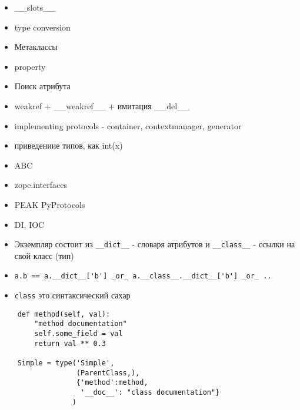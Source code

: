 \documentclass{article}
\begin{document}
\LARGE

\begin{itemize}
    \item \_\_slots\_\_
    \item type conversion
    \item Метаклассы
    \item property
    \item Поиск атрибута
    \item weakref + \_\_weakref\_\_ + имитация \_\_del\_\_
    \item implementing protocols - container, contextmanager, generator
    \item приведениие типов, как int(x)
    \item ABC
    \item zope.interfaces
    \item PEAK PyProtocols
    \item DI, IOC
\end{itemize}
\newpage

\begin{itemize}
\item Экземпляр состоит из \lstinline!__dict__! - словаря атрибутов и 
        \lstinline!__class__! - ссылки на свой класс (тип)
\item \lstinline!a.b == a.__dict__['b'] _or_ a.__class__.__dict__['b'] _or_ ..!
\end{itemize}
\newpage

\begin{itemize}
\item \lstinline!class! это синтаксический сахар
\end{itemize}
{
\LARGE \vspace{15pt}
\begin{lstlisting}
    def method(self, val):
        "method documentation"
        self.some_field = val
        return val ** 0.3

    Simple = type('Simple', 
                  (ParentClass,), 
                  {'method':method, 
                   '__doc__': "class documentation"}
                 )
\end{lstlisting}
}
\newpage
\end{document}
